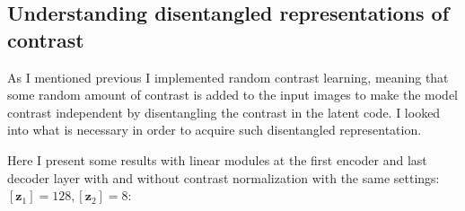 \documentclass[12pt, english]{article}
\begin{document}
\vspace{7mm}

\subsection{Understanding disentangled representations of contrast}

\vspace{5mm}

\par As I mentioned previous I implemented random contrast learning, meaning that some random amount of contrast is added to the input images to make the model contrast independent by disentangling the contrast in the latent code. I looked into what is necessary in order to acquire such disentangled representation.

\vspace{4mm}

\par Here I present some results with linear modules at the first encoder and last decoder layer with and without contrast normalization with the same settings: $[\bm{z}_{1}] = 128, [\bm{z}_{2}] = 8$:

\vspace{4mm}
\end{document}
